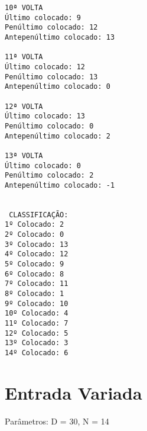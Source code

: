 \documentclass[10pt,twoside,a4paper]{article}
\begin{document}
\begin{verbatim}
10ª VOLTA
Último colocado: 9
Penúltimo colocado: 12
Antepenúltimo colocado: 13

11ª VOLTA
Último colocado: 12
Penúltimo colocado: 13
Antepenúltimo colocado: 0

12ª VOLTA
Último colocado: 13
Penúltimo colocado: 0
Antepenúltimo colocado: 2

13ª VOLTA
Último colocado: 0
Penúltimo colocado: 2
Antepenúltimo colocado: -1


 CLASSIFICAÇÃO:
1º Colocado: 2
2º Colocado: 0
3º Colocado: 13
4º Colocado: 12
5º Colocado: 9
6º Colocado: 8
7º Colocado: 11
8º Colocado: 1
9º Colocado: 10
10º Colocado: 4
11º Colocado: 7
12º Colocado: 5
13º Colocado: 3
14º Colocado: 6
\end{verbatim}

\section{Entrada Variada}
Parâmetros: D = 30, N = 14
\end{document}
